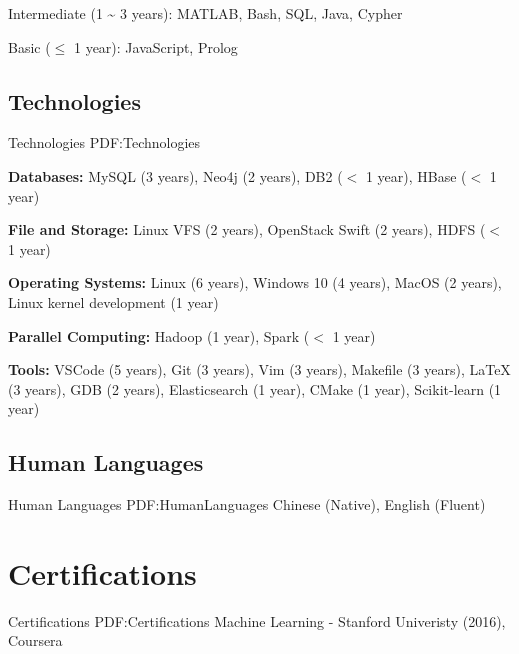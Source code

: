 \documentclass[letterpaper,10pt,oneside]{article}
\begin{document}
\begin{body}
\GapNoBreak
\BulletItem
Intermediate (1 {\textasciitilde} 3 years): MATLAB, Bash, SQL, Java, Cypher

\GapNoBreak
\BulletItem
Basic ($\leq$ 1 year): JavaScript, Prolog
\BigGap
\GapNoBreak
\subsection
{Technologies}
{Technologies}
{PDF:Technologies}

\GapNoBreak
\BulletItem
\textbf{Databases:} MySQL (3 years), Neo4j (2 years), DB2 ($<$ 1 year), HBase ($<$ 1 year)

\GapNoBreak
\BulletItem
\textbf{File and Storage:} Linux VFS (2 years), OpenStack Swift (2 years), HDFS ($<$ 1 year)



\GapNoBreak
\BulletItem
\textbf{Operating Systems:} Linux (6 years), Windows 10 (4 years), MacOS (2 years), Linux kernel development (1 year)


\GapNoBreak
\BulletItem
\textbf{Parallel Computing:} Hadoop (1 year), Spark ($<$ 1 year)

\GapNoBreak
\BulletItem
\textbf{Tools:} VSCode (5 years), Git (3 years), Vim (3 years), Makefile (3 years), {\LaTeX} (3 years), GDB (2 years), Elasticsearch (1 year), CMake (1 year), Scikit-learn (1 year)

\BigGap
\subsection
{Human Languages}
{Human Languages}
{PDF:HumanLanguages}
\GapNoBreak
\BulletItem
Chinese (Native), English (Fluent)


\section
{Certifications}
{Certifications}
{PDF:Certifications}
Machine Learning - Stanford Univeristy (2016), Coursera
\GapNoBreak




\end{body}
\end{document}
